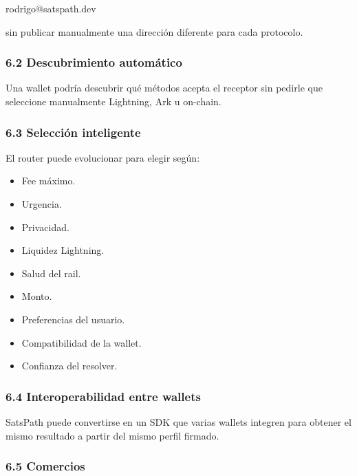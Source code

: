 \documentclass[
]{article}
\newenvironment{Shaded}{}{}
\newcommand{\NormalTok}[1]{#1}
\providecommand{\tightlist}{%
  \setlength{\itemsep}{0pt}\setlength{\parskip}{0pt}}
\begin{document}
\begin{Shaded}
\begin{Highlighting}[]
\NormalTok{rodrigo@satspath.dev}
\end{Highlighting}
\end{Shaded}

sin publicar manualmente una dirección diferente para cada protocolo.

\hypertarget{descubrimiento-automuxe1tico}{%
\subsubsection{6.2 Descubrimiento
automático}\label{descubrimiento-automuxe1tico}}

Una wallet podría descubrir qué métodos acepta el receptor sin pedirle
que seleccione manualmente Lightning, Ark u on-chain.

\hypertarget{selecciuxf3n-inteligente}{%
\subsubsection{6.3 Selección
inteligente}\label{selecciuxf3n-inteligente}}

El router puede evolucionar para elegir según:

\begin{itemize}
\tightlist
\item
  Fee máximo.
\item
  Urgencia.
\item
  Privacidad.
\item
  Liquidez Lightning.
\item
  Salud del rail.
\item
  Monto.
\item
  Preferencias del usuario.
\item
  Compatibilidad de la wallet.
\item
  Confianza del resolver.
\end{itemize}

\hypertarget{interoperabilidad-entre-wallets}{%
\subsubsection{6.4 Interoperabilidad entre
wallets}\label{interoperabilidad-entre-wallets}}

SatsPath puede convertirse en un SDK que varias wallets integren para
obtener el mismo resultado a partir del mismo perfil firmado.

\hypertarget{comercios}{%
\subsubsection{6.5 Comercios}\label{comercios}}
\end{document}
